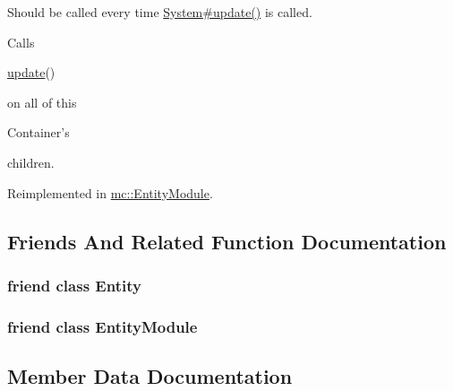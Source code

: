 Should be called every time \hyperlink{classmc_1_1_system_a90e14e44eb5a6019c913a6a197deb4a0}{System\#update()} is called. 

Calls
\begin{DoxyCode}
\hyperlink{classmc_1_1_container_a306bb7d15cee23ff8bef4b9342ed85cf}{update}() 
\end{DoxyCode}
 on all of this
\begin{DoxyCode}
Container\textcolor{stringliteral}{'s }
\end{DoxyCode}
 children. 

Reimplemented in \hyperlink{classmc_1_1_entity_module_a3307eb2ce5af81b6a6e26fdaa12e3063}{mc\+::\+Entity\+Module}.



\subsection{Friends And Related Function Documentation}
\subsubsection[{\texorpdfstring{Entity}{Entity}}]{\setlength{\rightskip}{0pt plus 5cm}friend class {\bf Entity}\hspace{0.3cm}{\ttfamily [friend]}}\hypertarget{classmc_1_1_container_a614439ccac0344926adc4c0165d64060}{}\label{classmc_1_1_container_a614439ccac0344926adc4c0165d64060}
\subsubsection[{\texorpdfstring{Entity\+Module}{EntityModule}}]{\setlength{\rightskip}{0pt plus 5cm}friend class {\bf Entity\+Module}\hspace{0.3cm}{\ttfamily [friend]}}\hypertarget{classmc_1_1_container_a8dbbff2e42cb66216ff15cfa5272a1c9}{}\label{classmc_1_1_container_a8dbbff2e42cb66216ff15cfa5272a1c9}


\subsection{Member Data Documentation}
